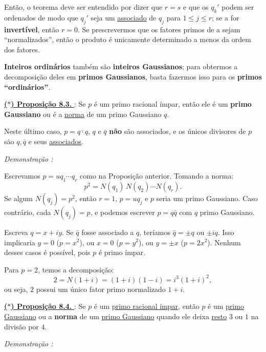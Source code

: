 Então, o teorema deve ser entendido por dizer que $r = s$ e que os $q_k'$ podem ser ordenados de
modo que $q_j'$ seja um \underline{associado} de $q_j$ para $1 \leq j \leq r$; se a for \textbf{invertível}, então $r = 0$. 
Se prescrevermos que os fatores primos de a sejam “normalizados”, então o produto é unicamente determinado a menos da
ordem dos fatores.

\textbf{Inteiros ordinários} também são \textbf{inteiros Gaussianos}; para obtermos a decomposição deles em \textbf{primos
Gaussianos}, basta fazermos isso para os \textbf{primos “ordinários”}.

\vspace{0.2cm}
\noindent\underline{\underline{\textbf{($\ast$) Proposição 8.3. }}} : Se $p$ é um primo racional ímpar, então ele é um \textbf{primo Gaussiano} ou é a \underline{norma} de um primo Gaussiano $q$.  

Neste último caso, $p = q\bar \cdot {q}$, $q$ e $\bar{q}$ \textbf{não} são associados, e os únicos divisores de $p$ são $q, \bar{q}$ e seus \underline{associados}.

\vspace{0.2cm}
\noindent\textit{Demonstração : }

Escrevamos $p = u q_1 \cdots q_r$ como na Proposição anterior.  
Tomando a norma:
\[
p^2 = N(q_1)\,N(q_2)\cdots N(q_r).
\]
Se algum $N(q_j) = p^2$, então $r=1$, $p = u q_j$ e $p$ seria um primo Gaussiano.  
Caso contrário, cada $N(q_j) = p$, e podemos escrever $p = q\bar{q}$ com $q$ primo Gaussiano.  

Escreva $q = x+iy$.  
Se $\bar{q}$ fosse associado a $q$, teríamos $\bar{q} = \pm q$ ou $\pm iq$.  
Isso implicaria $y=0$ ($p=x^2$), ou $x=0$ ($p=y^2$), ou $y=\pm x$ ($p=2x^2$).  
Nenhum desses casos é possível, pois $p$ é primo ímpar.

\vspace{0.3cm}

Para $p=2$, temos a decomposição:
\[
2 = N(1+i) = (1+i)(1-i) = i^3 (1+i)^2,
\]
ou seja, $2$ possui um único fator primo normalizado $1+i$.

\vspace{0.2cm}
\noindent\underline{\underline{\textbf{($\ast$) Proposição 8.4. }}} : Se $p$ é um \underline{primo racional ímpar}, então $p$ é um \underline{primo Gaussiano} ou 
a \textbf{norma} de um \underline{primo Gaussiano} quando ele deixa \underline{resto} $3$ ou $1$ na divisão por $4$.

\vspace{0.2cm}
\noindent\textit{Demonstração : }

